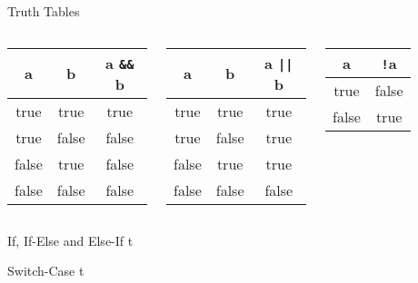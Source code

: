 \documentclass[../lecture3-flowofcontrol.tex]{subfiles}
\begin{document}
\begin{frame}[fragile]{Truth Tables}
    \begin{columns}[T,onlytextwidth]
            \begin{table}
                \begin{tabular}{c|c|c}
                    \toprule
                    \textbf{a} & \textbf{b} & \bfseries{a \verb|&&| b} \\
                    \midrule
                    true  & true  & true  \\
                    true  & false & false \\
                    false & true  & false \\
                    false & false & false \\
                    \bottomrule
                \end{tabular}
            \end{table}
            \begin{table}
                \begin{tabular}{c|c|c}
                    \toprule
                    \textbf{a} & \textbf{b} & \bfseries{a \verb+||+ b} \\
                    \midrule
                    true  & true  & true  \\
                    true  & false & true  \\
                    false & true  & true  \\
                    false & false & false \\
                    \bottomrule
                \end{tabular}
            \end{table}
            \begin{table}
                \begin{tabular}{c|c}
                    \toprule
                    \textbf{a} & \bfseries{\verb|!|a} \\
                    \midrule
                    true  & false \\
                    false & true  \\
                    \bottomrule
                \end{tabular}
            \end{table}
    \end{columns}

    
\end{frame}


\begin{frame}[fragile]{If, If-Else and Else-If}
t
\end{frame}


\begin{frame}[fragile]{Switch-Case}
t
\end{frame}

\end{document}

